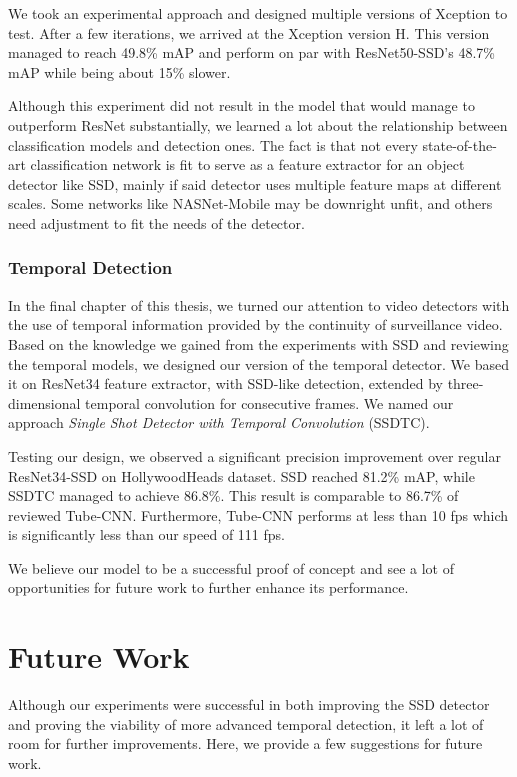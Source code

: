 We took an experimental approach and designed multiple versions of Xception to test. After a few iterations, we arrived at the Xception version H. This version managed to reach 49.8\% mAP and perform on par with ResNet50-SSD's 48.7\% mAP while being about 15\% slower.

Although this experiment did not result in the model that would manage to outperform ResNet substantially, we learned a lot about the relationship between classification models and detection ones. The fact is that not every state-of-the-art classification network is fit to serve as a feature extractor for an object detector like SSD, mainly if said detector uses multiple feature maps at different scales. Some networks like NASNet-Mobile may be downright unfit, and others need adjustment to fit the needs of the detector.

\subsubsection*{Temporal Detection}
In the final chapter of this thesis, we turned our attention to video detectors with the use of temporal information provided by the continuity of surveillance video. Based on the knowledge we gained from the experiments with SSD and reviewing the temporal models, we designed our version of the temporal detector. We based it on ResNet34 feature extractor, with SSD-like detection, extended by three-dimensional temporal convolution for consecutive frames. We named our approach \textit{Single Shot Detector with Temporal Convolution} (SSDTC).

Testing our design, we observed a significant precision improvement over regular ResNet34-SSD on HollywoodHeads dataset. SSD reached 81.2\% mAP, while SSDTC managed to achieve 86.8\%. This result is comparable to 86.7\% of reviewed Tube-CNN. Furthermore, Tube-CNN performs at less than 10 fps which is significantly less than our speed of 111 fps. 

We believe our model to be a successful proof of concept and see a lot of opportunities for future work to further enhance its performance.


\section*{Future Work}
Although our experiments were successful in both improving the SSD detector and proving the viability of more advanced temporal detection, it left a lot of room for further improvements. Here, we provide a few suggestions for future work.

